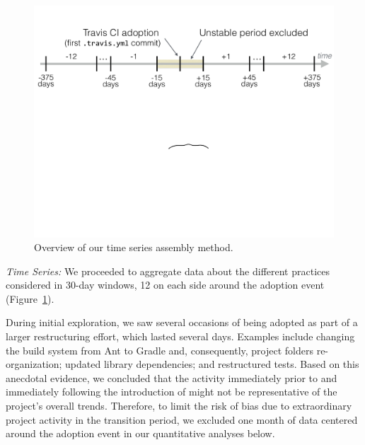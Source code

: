 \begin{figure}[t]
	\centering
	\includegraphics[width=0.8\columnwidth, clip=true, trim=0 392 0 40]{figures/timeline.pdf}
	\caption{Overview of our time series assembly method.}\vspace{-0.3cm}
	\label{fig:timeseries}
\end{figure}

\smallskip\noindent\emph{Time Series:}
We proceeded to aggregate data about the different practices considered
in 30-day windows, 12 on each side around the \Tvis adoption event
(Figure~\ref{fig:timeseries}).

During initial exploration, we saw several occasions of \Tvi being 
adopted as part of a larger restructuring effort, which lasted several days.
Examples include changing the build system from Ant to Gradle and, 
consequently, project folders re-organization; updated library 
dependencies; and restructured tests.
Based on this anecdotal evidence, we concluded that the activity immediately 
prior to and immediately following the introduction of \Tvis might not be 
representative of the project's overall trends.
Therefore, to limit the risk of bias due to extraordinary project activity in 
the transition period, we excluded one month of data centered around the 
adoption event in our quantitative analyses below.


